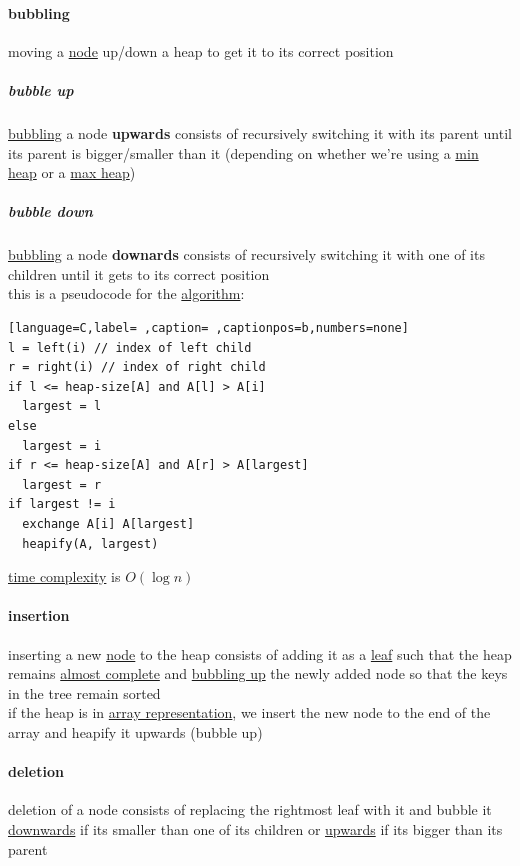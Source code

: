 \documentclass[a4paper,12pt]{article}
\begin{document}
\paragraph{bubbling}
\label{sec:org74642bd}
\begin{definition}
moving a \hyperref[sec:orgec4976f]{node} up/down a heap to get it to its correct position\\[0pt]
\end{definition}
\subparagraph{bubble up}
\label{sec:org389e434}
\hyperref[sec:org74642bd]{bubbling} a node \textbf{upwards} consists of recursively switching it with its parent until its parent is bigger/smaller than it (depending on whether we're using a \hyperref[sec:orgc87ebb0]{min heap} or a \hyperref[sec:org75e2e7b]{max heap})\\[0pt]
\subparagraph{bubble down}
\label{sec:org3bbfb76}
\hyperref[sec:org74642bd]{bubbling} a node \textbf{downards} consists of recursively switching it with one of its children until it gets to its correct position\\[0pt]
this is a pseudocode for the \href{20220706211958-algorithm.org}{algorithm}:\\[0pt]
\begin{lstlisting}[language=C,label= ,caption= ,captionpos=b,numbers=none]
l = left(i) // index of left child
r = right(i) // index of right child
if l <= heap-size[A] and A[l] > A[i]
  largest = l
else
  largest = i
if r <= heap-size[A] and A[r] > A[largest]
  largest = r
if largest != i
  exchange A[i] A[largest]
  heapify(A, largest)
\end{lstlisting}
\href{20221130014441-time_complexity.org}{time complexity} is \(O(\log n)\)\\[0pt]
\paragraph{insertion}
\label{sec:org2f88fcf}
inserting a new \hyperref[sec:orgec4976f]{node} to the heap consists of adding it as a \hyperref[sec:orge114c93]{leaf} such that the heap remains \hyperref[sec:orgcd32ba8]{almost complete} and \hyperref[sec:org389e434]{bubbling up} the newly added node so that the keys in the tree remain sorted\\[0pt]
if the heap is in \hyperref[sec:org93e8c49]{array representation}, we insert the new node to the end of the array and heapify it upwards (bubble up)\\[0pt]
\paragraph{deletion}
\label{sec:org40f555e}
deletion of a node consists of replacing the rightmost leaf with it and bubble it \hyperref[sec:org3bbfb76]{downwards} if its smaller than one of its children or \hyperref[sec:org389e434]{upwards} if its bigger than its parent\\[0pt]
\end{document}
